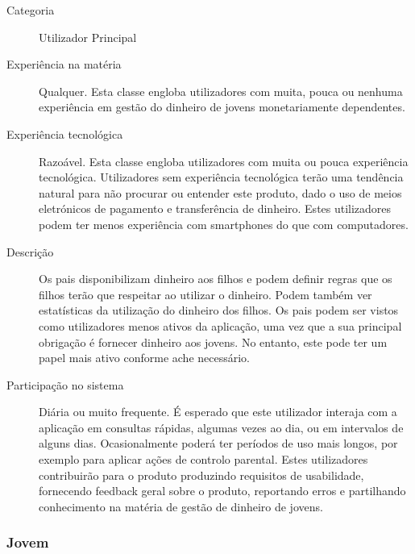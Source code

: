 \documentclass{article}
\begin{document}
      \begin{description}
        \item[Categoria] Utilizador Principal
        \item[Experiência na matéria] Qualquer. Esta classe engloba utilizadores com muita, pouca ou nenhuma experiência em gestão do dinheiro de jovens monetariamente dependentes.
        \item[Experiência tecnológica] Razoável. Esta classe engloba utilizadores com muita ou pouca experiência tecnológica. Utilizadores sem experiência tecnológica terão uma tendência natural para não procurar ou entender este produto, dado o uso de meios eletrónicos de pagamento e transferência de dinheiro. Estes utilizadores podem ter menos experiência com smartphones do que com computadores.
        \item[Descrição] Os pais disponibilizam dinheiro aos filhos e podem definir regras que os filhos terão que respeitar ao utilizar o dinheiro. Podem também ver estatísticas da utilização do dinheiro dos filhos.
        Os pais podem ser vistos como utilizadores menos ativos da aplicação, uma vez que a sua principal obrigação é fornecer dinheiro aos jovens. No entanto, este pode ter um papel mais ativo conforme ache necessário.
        \item[Participação no sistema] Diária ou muito frequente. É esperado que este utilizador interaja com a aplicação em consultas rápidas, algumas vezes ao dia, ou em intervalos de alguns dias. Ocasionalmente poderá ter períodos de uso mais longos, por exemplo para aplicar ações de controlo parental. Estes utilizadores contribuirão para o produto produzindo requisitos de usabilidade, fornecendo feedback geral sobre o produto, reportando erros e partilhando conhecimento na matéria de gestão de dinheiro de jovens.
      \end{description}

    \subsubsection{Jovem}
\end{document}
